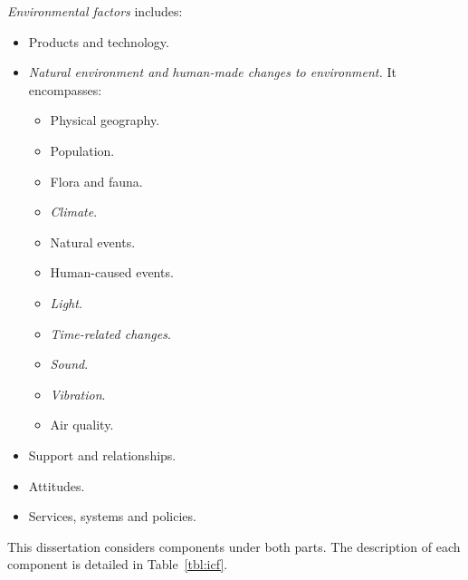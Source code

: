 \textit{Environmental factors} includes:

\begin{itemize}
  \item Products and technology.
  \item \textit{Natural environment and human-made changes to environment.} It 
  encompasses:
  \begin{itemize}
    \item Physical geography.
    \item Population.
    \item Flora and fauna.
    \item \textit{Climate}.
    \item Natural events.
    \item Human-caused events.
    \item \textit{Light}.
    \item \textit{Time-related changes}.
    \item \textit{Sound}.
    \item \textit{Vibration}.
    \item Air quality.
  \end{itemize}

  \item Support and relationships.
  \item Attitudes.
  \item Services, systems and policies.
\end{itemize}


This dissertation considers components under both parts. The description of each
component is detailed in Table~\ref{tbl:icf}.

